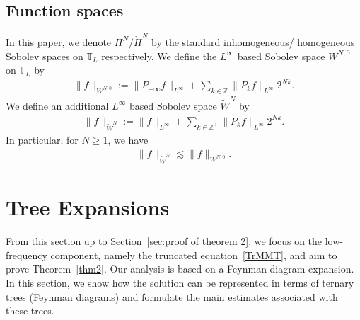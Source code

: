 \documentclass[UTF-8,reqno]{amsart}
\numberwithin{equation}{section}
\theoremstyle{definition}
\def\geq{\geqslant}
\def\geq{\geqslant}
\begin{document}
\subsection{Function spaces}
In this paper, we denote $H^N/\dot{H}^N$ by the  standard inhomogeneous/ homogeneous  Sobolev spaces on $\mathbb{T}_L$ respectively.  We define the $L^\infty$ based Sobolev space $W^{N,0}$ on $\mathbb{T}_L$ by
\begin{align*}
    \|f\|_{W^{N,0}}:=\|P_{-\infty}f\|_{L^\infty}+\sum_{k\in\mathbb{Z}}\|P_kf\|_{L^\infty}2^{Nk}.
\end{align*}
We define an additional $L^\infty$ based Sobolev space $\widetilde{W}^N$ by
\begin{align*}\|f\|_{\widetilde{W}^N}:=\|f\|_{L^\infty}+\sum_{k\in\mathbb{Z}^+}\|P_kf\|_{L^\infty}2^{Nk}.
\end{align*}
In particular, for $N\geq1$, we have
\begin{align}
    \|f\|_{\widetilde{W}^N}\lesssim  \|f\|_{W^{N,0}}.
\end{align}

  \section{Tree Expansions}\label{trees and LTE}
  From this section up to Section~\ref{sec:proof of theorem 2}, we focus on the low-frequency component, namely the truncated equation~\eqref{TrMMT}, and aim to prove Theorem~\ref{thm2}.
Our analysis is based on a Feynman diagram expansion. In this section, we show how the solution can be represented in terms of ternary trees (Feynman diagrams) and formulate the main estimates associated with these trees.  
\end{document}
